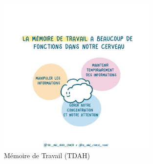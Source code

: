 \documentclass[11pt,a4paper]{report}
\begin{document}
\begin{figure}[h]
    \centering
    \includegraphics[width=0.7\textwidth]{images/ADHD-Working-Memory.png}
    \caption{Mémoire de Travail (TDAH)}
    \label{fig:tdah}
\end{figure}
\end{document}
